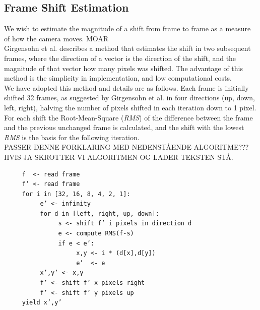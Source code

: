\subsection{Frame Shift Estimation}\label{sec:frame_shift_estimation}
%
We wish to estimate the magnitude of a shift from frame to frame as a measure of how the camera moves. MOAR\\
Girgensohn et al.\cite{Girgensohn:2000:SAH:354401.354415} describes a method that estimates the shift in two subsequent frames, where the direction of a vector is the direction of the shift, and the magnitude of that vector how many pixels was shifted. The advantage of this method is the simplicity in implementation, and low computational costs.\\
We have adopted this method and details are as follows. Each frame is initially shifted 32 frames, as suggested by Girgensohn et al. in four directions (up, down, left, right), halving the number of pixels shifted in each iteration down to 1 pixel.
For each shift the Root-Mean-Square (\textit{RMS}) of the difference between the frame and the previous unchanged frame is calculated, and the shift with the lowest \textit{RMS} is the basis for the following iteration. %
\\PASSER DENNE FORKLARING MED NEDENSTÅENDE ALGORITME??? HVIS JA SKROTTER VI ALGORITMEN OG LADER TEKSTEN STÅ.
%
\begin{verbatim}
     f  <- read frame
     f’ <- read frame
     for i in [32, 16, 8, 4, 2, 1]:
          e’ <- infinity
          for d in [left, right, up, down]:
               s <- shift f’ i pixels in direction d
               e <- compute RMS(f-s)
               if e < e’:
                    x,y <- i * (d[x],d[y])
                    e’  <- e
          x’,y’ <- x,y
          f’ <- shift f’ x pixels right
          f’ <- shift f’ y pixels up
     yield x’,y’
\end{verbatim}
